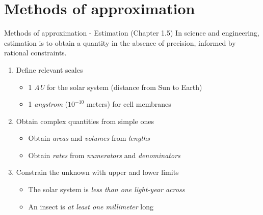 \documentclass{beamer}
\begin{document}
\section{Methods of approximation}

\begin{frame}{Methods of approximation - Estimation (Chapter 1.5)}
In science and engineering, \alert{estimation} is to obtain a quantity in the absence of precision, informed by rational constraints.
\begin{enumerate}
\item Define relevant \alert{scales}
\begin{itemize}
\item 1 \textit{AU} for the solar system (distance from Sun to Earth)
\item 1 \textit{angstrom} ($10^{-10}$ meters) for cell membranes
\end{itemize}
\item Obtain \alert{complex quantities} from simple ones
\begin{itemize}
\item Obtain \textit{areas} and \textit{volumes} from \textit{lengths}
\item Obtain \textit{rates} from \textit{numerators} and \textit{denominators}
\end{itemize}
\item Constrain the unknown with \alert{upper} and \alert{lower} limits
\begin{itemize}
\item The solar system is \textit{less than one light-year across}
\item An insect is \textit{at least one millimeter} long
\end{itemize}
\end{enumerate}
\end{frame}
\end{document}

